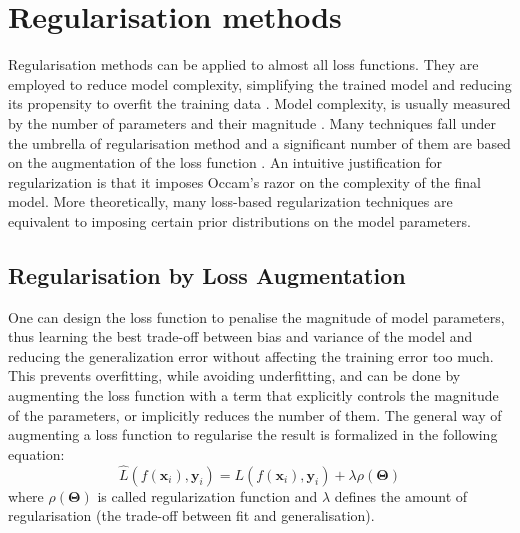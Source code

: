 \documentclass[sn-mathphys-num]{sn-jnl}%
\renewcommand\vec{\mathbf}
\begin{document}



    
\section{Regularisation methods}    \label{sec:regularisation}
Regularisation methods can be applied to almost all loss functions. They are employed to reduce model complexity, simplifying the trained model and reducing its propensity to overfit the training data \cite{regularisation-cambridge-book,regularisation-for-deep-learning,model-selection-and-error-estimation}. Model complexity, is usually measured by the number of parameters and their magnitude \cite{model-selection-and-error-estimation,importance-of-complexity-in-model-selection,ML_2}. Many techniques fall under the umbrella of regularisation method and a significant number of them are based on the augmentation of the loss function \cite{regularisation-cambridge-book,ML_2}. An intuitive justification for regularization is that it imposes Occam's razor on the complexity of the final model. More theoretically, many loss-based regularization techniques are equivalent to imposing certain prior distributions on the model parameters.

\subsection{Regularisation by Loss Augmentation}
One can design the loss function to penalise the magnitude of model parameters, thus learning the best trade-off between bias and variance of the model and reducing the generalization error without affecting the training error too much. This prevents overfitting, while avoiding underfitting, and can be done by augmenting the loss function with a term that explicitly controls the magnitude of the parameters, or implicitly reduces the number of them. 
The general way of augmenting a loss function to regularise the result is formalized in the following equation:
\begin{equation}
\widehat{L}(f(\vec{x}_i),\vec{y}_i)  = L(f(\vec{x}_i),\vec{y}_i) + \lambda \rho(\vec{\Theta})
\end{equation}
where $\rho(\vec{\Theta})$ is called regularization function and $\lambda$ defines the amount of regularisation (the trade-off between fit and generalisation).
\end{document}
